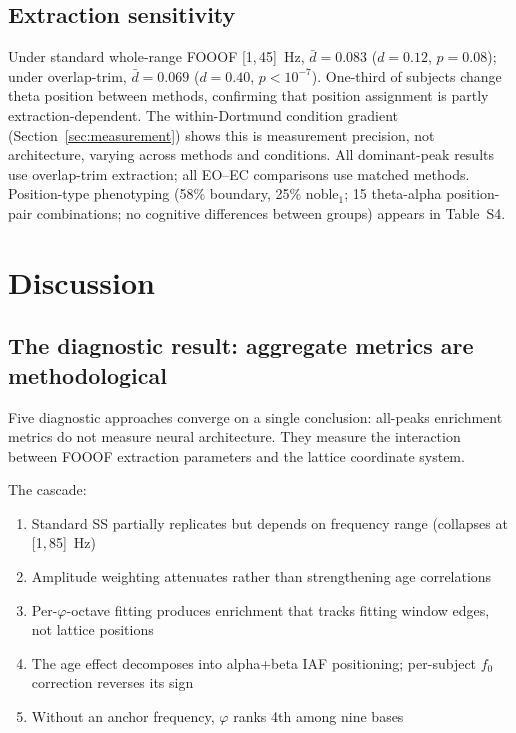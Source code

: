 \documentclass[11pt,a4paper]{article}
\newcommand{\phisym}{\varphi}
\newcommand{\fzero}{f_0}
\begin{document}
\subsection{Extraction sensitivity}
\label{sec:phenotyping}

Under standard whole-range FOOOF [1,\,45]~Hz, $\bar{d} = 0.083$ ($d = 0.12$, $p = 0.08$); under overlap-trim, $\bar{d} = 0.069$ ($d = 0.40$, $p < 10^{-7}$). One-third of subjects change theta position between methods, confirming that position assignment is partly extraction-dependent. The within-Dortmund condition gradient (Section~\ref{sec:measurement}) shows this is measurement precision, not architecture, varying across methods and conditions. All dominant-peak results use overlap-trim extraction; all EO--EC comparisons use matched methods. Position-type phenotyping (58\% boundary, 25\% noble$_1$; 15 theta-alpha position-pair combinations; no cognitive differences between groups) appears in Table~S4.

\section{Discussion}

\subsection{The diagnostic result: aggregate metrics are methodological}

Five diagnostic approaches converge on a single conclusion: all-peaks enrichment metrics do not measure neural architecture. They measure the interaction between FOOOF extraction parameters and the lattice coordinate system.

The cascade:
\begin{enumerate}
    \item Standard SS partially replicates but depends on frequency range (collapses at [1,\,85]~Hz)
    \item Amplitude weighting attenuates rather than strengthening age correlations
    \item Per-$\phisym$-octave fitting produces enrichment that tracks fitting window edges, not lattice positions
    \item The age effect decomposes into alpha+beta IAF positioning; per-subject $\fzero$ correction reverses its sign
    \item Without an anchor frequency, $\phisym$ ranks 4th among nine bases
\end{enumerate}
\end{document}
